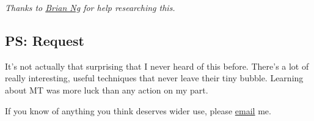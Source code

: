 \emph{Thanks to \href{https://twitter.com/sindarknave}{Brian Ng} for
help researching this.}

\subsection{PS: Request}\label{ps-request}

It's not actually that surprising that I never heard of this before.
There's a lot of really interesting, useful techniques that never leave
their tiny bubble. Learning about MT was more luck than any action on my
part.

If you know of anything you think deserves wider use, please
\href{mailto:h@hillelwayne.com}{email} me.
